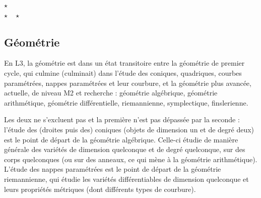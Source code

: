 \documentclass{article}
\def\separateur{\begin{center}
$\star$\\
$\star\quad\star$
\end{center}}
\begin{document}
\separateur
\subsection{Géométrie}

En L3, la géométrie est dans un état transitoire entre la géométrie de premier cycle, qui culmine (culminait) dans l'étude des coniques, quadriques, courbes paramétrées, nappes paramétrées et leur courbure, et la géométrie plus avancée, actuelle, de niveau M2 et recherche : géométrie algébrique, géométrie arithmétique, géométrie différentielle, riemannienne, symplectique, finslerienne.

Les deux ne s'excluent pas et la première n'est pas \og dépassée\fg{} par la seconde : l'étude des (droites puis des) coniques (objets de dimension un et de degré deux) est le point de départ de la géométrie algébrique. Celle-ci étudie de manière générale des variétés de dimension quelconque et de degré quelconque, sur des corps quelconques (ou sur des anneaux, ce qui mène à la géométrie arithmétique). L'étude des nappes paramétrées est le point de départ de la géométrie riemannienne, qui étudie les variétés différentiables de dimension quelconque et leurs propriétés métriques (dont différents types de courbure).
\end{document}
